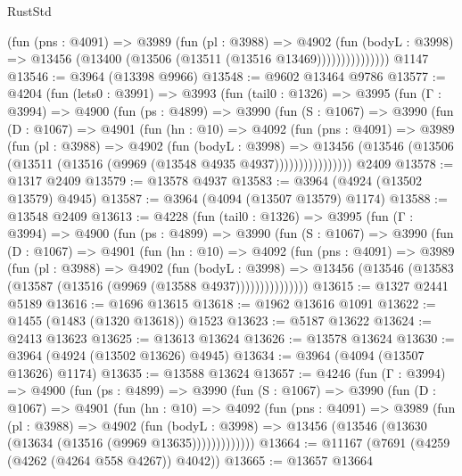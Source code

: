 \begin{lexlean}{RustStd}
\begin{coremodule}
{\begin{coremodule}
{{{{{{{{{{{{{{{{{{{{{{{{{{{{{{{{{{{{{{                    (fun (pns : @4091) =>
                    @3989
                      (fun (pl : @3988) =>
                      @4902
                        (fun (bodyL : @3998) =>
                        @13456 (@13400 (@13506 (@13511 (@13516 @13469)))))))))))))))
    @1147
@13546 := @3964 (@13398 @9966)
@13548 := @9602 @13464 @9786
@13577 := @4204
    (fun (lets0 : @3991) =>
    @3993
      (fun (tail0 : @1326) =>
      @3995
        (fun (Γ : @3994) =>
        @4900
          (fun (ps : @4899) =>
          @3990
            (fun (S : @1067) =>
            @3990
              (fun (D : @1067) =>
              @4901
                (fun (hn : @10) =>
                @4092
                  (fun (pns : @4091) =>
                  @3989
                    (fun (pl : @3988) =>
                    @4902
                      (fun (bodyL : @3998) =>
                      @13456
                        (@13546 (@13506 (@13511 (@13516 (@9969 (@13548 @4935 @4937))))))))))))))))
    @2409
@13578 := @1317 @2409
@13579 := @13578 @4937
@13583 := @3964 (@4924 (@13502 @13579) @4945)
@13587 := @3964 (@4094 (@13507 @13579) @1174)
@13588 := @13548 @2409
@13613 := @4228
    (fun (tail0 : @1326) =>
    @3995
      (fun (Γ : @3994) =>
      @4900
        (fun (ps : @4899) =>
        @3990
          (fun (S : @1067) =>
          @3990
            (fun (D : @1067) =>
            @4901
              (fun (hn : @10) =>
              @4092
                (fun (pns : @4091) =>
                @3989
                  (fun (pl : @3988) =>
                  @4902
                    (fun (bodyL : @3998) =>
                    @13456 (@13546 (@13583 (@13587 (@13516 (@9969 (@13588 @4937)))))))))))))))
@13615 := @1327 @2441 @5189
@13616 := @1696 @13615
@13618 := @1962 @13616 @1091
@13622 := @1455 (@1483 (@1320 @13618)) @1523
@13623 := @5187 @13622
@13624 := @2413 @13623
@13625 := @13613 @13624
@13626 := @13578 @13624
@13630 := @3964 (@4924 (@13502 @13626) @4945)
@13634 := @3964 (@4094 (@13507 @13626) @1174)
@13635 := @13588 @13624
@13657 := @4246
    (fun (Γ : @3994) =>
    @4900
      (fun (ps : @4899) =>
      @3990
        (fun (S : @1067) =>
        @3990
          (fun (D : @1067) =>
          @4901
            (fun (hn : @10) =>
            @4092
              (fun (pns : @4091) =>
              @3989
                (fun (pl : @3988) =>
                @4902
                  (fun (bodyL : @3998) =>
                  @13456 (@13546 (@13630 (@13634 (@13516 (@9969 @13635)))))))))))))
@13664 := @11167 (@7691 (@4259 (@4262 (@4264 @558 @4267)) @4042))
@13665 := @13657 @13664
}}}}}}}}}}}}}}}}}}}}}}}}}}}}}}}}}}}}}}
\end{coremodule}}
\end{coremodule}
\end{lexlean}
